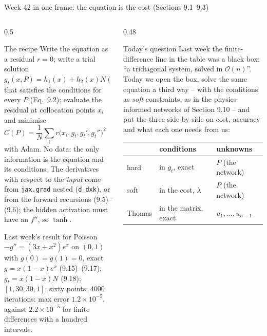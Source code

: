 \documentclass[10pt,aspectratio=169]{beamer}
\begin{document}

\begin{frame}{Week 42 in one frame: the equation is the cost (Sections 9.1--9.3)}
\small
\begin{columns}[T]
\begin{column}{0.5\textwidth}
\begin{block}{The recipe}
\scriptsize
Write the equation as a residual $r=0$; write a trial solution
$g_t(x,P)=h_1(x)+h_2(x)N(x,P)$ that satisfies the conditions for every $P$
(Eq.~9.2); evaluate the residual at collocation points $x_i$ and minimise
\[
  C(P)=\frac{1}{N}\sum_i r\bigl(x_i,g_t,g_t',g_t''\bigr)^{2}\qquad(9.3)
\]
with Adam.  No data: the only information is the equation and its
conditions.  The derivatives with respect to the \emph{input} come from
\texttt{jax.grad} nested (\texttt{d\_dxk}), or from the forward recursions
(9.5)--(9.6); the hidden activation must have an $f''$, so $\tanh$.
\end{block}
\begin{block}{Last week's result for Poisson}
\scriptsize
$-g''=(3x+x^{2})e^{x}$ on $(0,1)$ with $g(0)=g(1)=0$, exact
$g=x(1-x)e^{x}$ (9.15)--(9.17); $g_t=x(1-x)N$ (9.18); $[1,30,30,1]$, sixty
points, $4000$ iterations: max error $1.2\times10^{-5}$, against
$2.2\times10^{-5}$ for finite differences with a hundred intervals.
\end{block}
\end{column}
\begin{column}{0.48\textwidth}
\begin{block}{Today's question}
\scriptsize
Last week the finite-difference line in the table was a black box: ``a
tridiagonal system, solved in $\mathcal{O}(n)$''.  Today we open the box,
solve the same equation a third way -- with the conditions as \emph{soft}
constraints, as in the physics-informed networks of Section 9.10 -- and put
the three side by side on cost, accuracy and what each one needs from us:
\begin{center}
\begin{tabular}{@{}lll@{}}
\toprule
 & conditions & unknowns\\
\midrule
hard & in $g_t$, exact & $P$ (the network)\\
soft & in the cost, $\lambda$ & $P$ (the network)\\
Thomas & in the matrix, exact & $u_1,\dots,u_{n-1}$\\

\end{tabular}
\end{center}
\end{block}
\end{column}
\end{columns}
\end{frame}
\end{document}

